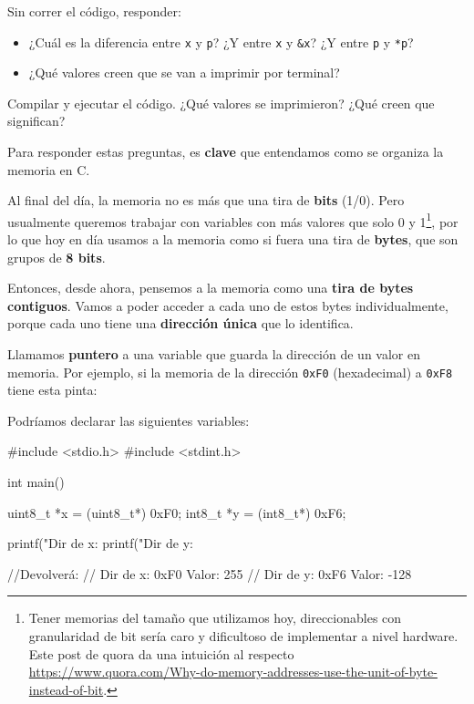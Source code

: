 \documentclass[]{scrartcl}
\begin{document}
\begin{exbox}[label=ejercicio1]
  Sin correr el código, responder:
  \begin{itemize}
    \item ¿Cuál es la diferencia entre \texttt{x} y \texttt{p}? ¿Y entre \texttt{x} y \texttt{\&x}? ¿Y entre \texttt{p} y \texttt{*p}?
    \item ¿Qué valores creen que se van a imprimir por terminal?
  \end{itemize}
\end{exbox}

\begin{exbox}[label=ejercicio2]
  Compilar y ejecutar el código. 
  ¿Qué valores se imprimieron?
  ¿Qué creen que significan?
\end{exbox}

Para responder estas preguntas, es \textbf{clave} que entendamos como se organiza la memoria en C.

Al final del día, la memoria no es más que una tira de \textbf{bits} (1/0).
Pero usualmente queremos trabajar con variables con más valores que solo 0 y 1\footnote{Tener memorias del tamaño que utilizamos hoy, direccionables con granularidad de bit sería caro y dificultoso de implementar a nivel hardware. Este post de quora da una intuición al respecto \url{https://www.quora.com/Why-do-memory-addresses-use-the-unit-of-byte-instead-of-bit}.}, por lo que hoy en día usamos a la memoria como si fuera una tira de \textbf{bytes}, que son grupos de \textbf{8 bits}.

Entonces, desde ahora, pensemos a la memoria como una \textbf{tira de bytes contiguos}.
Vamos a poder acceder a cada uno de estos bytes individualmente, porque cada uno tiene una \textbf{dirección única} que lo identifica.

Llamamos \textbf{puntero} a una variable que guarda la dirección de un valor en memoria. Por ejemplo, si la memoria de la dirección \texttt{0xF0} (hexadecimal) a \texttt{0xF8} tiene esta pinta:
%
\begin{center}
  \noindent {}
  \label{fig:tira-memoria}
\end{center}
%
Podríamos declarar las siguientes variables:
\begin{cbox}[unbreakable]{}
  #include <stdio.h>
  #include <stdint.h>

  int main(){
    uint8_t *x = (uint8_t*) 0xF0;
    int8_t *y = (int8_t*) 0xF6;

    printf("Dir de x: %
    printf("Dir de y: %

    //Devolverá:
    //  Dir de x: 0xF0 Valor: 255
    //  Dir de y: 0xF6 Valor: -128
  }
\end{cbox}
\end{document}
